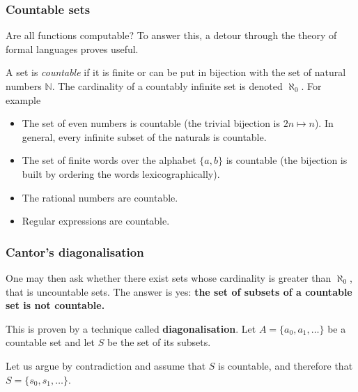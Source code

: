 \documentclass[compress,dvipdfmx]{beamer}
\begin{document}
%
\begin{frame}
\frametitle{Countable sets}

Are all functions computable? To answer this, a detour through the
theory of formal languages proves useful.

\bigskip

A set is \emph{countable} if it is finite or can be put in
bijection with the set of natural numbers $\mathbb{N}$. The
cardinality of a countably infinite set is denoted $\aleph_0$. For
example
\begin{itemize}

  \item The set of even numbers is countable (the trivial bijection
  is $2n \mapsto n$). In general, every infinite subset of the
  naturals is countable.

  \item The set of finite words over the alphabet $\{a,b\}$ is
  countable (the bijection is built by ordering the words
  lexicographically).

  \item The rational numbers are countable.

  \item Regular expressions are countable.

\end{itemize}

\end{frame}

%
\begin{frame}
\frametitle{Cantor's diagonalisation}

One may then ask whether there exist sets whose cardinality is greater
than $\aleph_0$, that is uncountable sets. The answer is yes:
\textbf{the set of subsets of a countable set is not countable.}

\bigskip

This is proven by a technique called \textbf{diagonalisation}. Let $A
= \{a_0, a_1, \ldots\}$ be a countable set and let $S$ be the set of
its subsets.

\bigskip

Let us argue by contradiction and assume that $S$ is countable, and
therefore that $S = \{s_0, s_1, \ldots\}$.

\end{frame}
\end{document}
